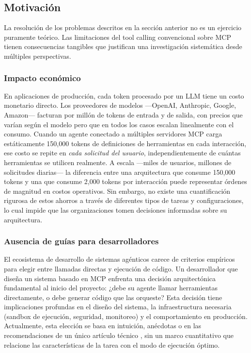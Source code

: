 \subsection{Motivación}

La resolución de los problemas descritos en la sección anterior no es un
ejercicio puramente teórico. Las limitaciones del tool calling convencional
sobre MCP tienen consecuencias tangibles que justifican una investigación
sistemática desde múltiples perspectivas.

\subsubsection{Impacto económico}

En aplicaciones de producción, cada token procesado por un LLM tiene un costo
monetario directo. Los proveedores de modelos ---OpenAI, Anthropic, Google,
Amazon--- facturan por millón de tokens de entrada y de salida, con precios que
varían según el modelo pero que en todos los casos escalan linealmente con el
consumo. Cuando un agente conectado a múltiples servidores MCP carga
estáticamente 150,000 tokens de definiciones de herramientas en cada
interacción, ese costo se repite en \textit{cada solicitud del usuario},
independientemente de cuántas herramientas se utilicen realmente. A escala
---miles de usuarios, millones de solicitudes diarias--- la diferencia entre
una arquitectura que consume 150,000 tokens y una que consume 2,000 tokens por
interacción puede representar órdenes de magnitud en costos operativos. Sin
embargo, no existe una cuantificación rigurosa de estos ahorros a través de
diferentes tipos de tareas y configuraciones, lo cual impide que las
organizaciones tomen decisiones informadas sobre su arquitectura.

\subsubsection{Ausencia de guías para desarrolladores}

El ecosistema de desarrollo de sistemas agénticos carece de criterios empíricos
para elegir entre llamadas directas y ejecución de código. Un desarrollador que
diseña un sistema basado en MCP enfrenta una decisión arquitectónica
fundamental al inicio del proyecto: ¿debe su agente llamar herramientas
directamente, o debe generar código que las orqueste? Esta decisión tiene
implicaciones profundas en el diseño del sistema, la infraestructura necesaria
(sandbox de ejecución, seguridad, monitoreo) y el comportamiento en producción.
Actualmente, esta elección se basa en intuición, anécdotas o en las
recomendaciones de un único artículo técnico \citep{anthropic2024codeexec}, sin
un marco cuantitativo que relacione las características de la tarea con el modo
de ejecución óptimo.

